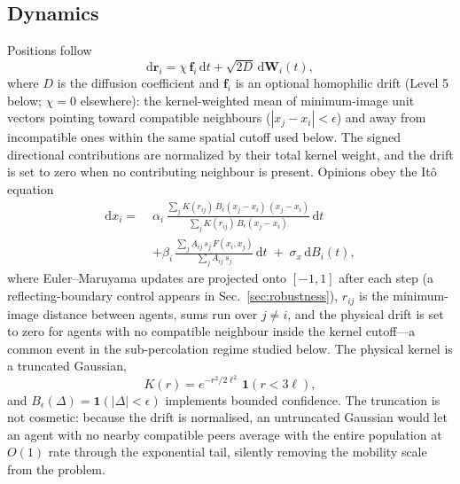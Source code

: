 \documentclass[5p,times,twocolumn]{elsarticle}
\newcommand{\rr}{\mathbf{r}}
\newcommand{\dd}{\mathrm{d}}
\begin{document}
\subsection{Dynamics}

Positions follow
\begin{equation}
  \dd\rr_i = \chi\, \mathbf{f}_i\,\dd t + \sqrt{2D}\,\dd\mathbf{W}_i(t),
  \label{eq:motion}
\end{equation}
where $D$ is the diffusion coefficient and $\mathbf{f}_i$ is an optional
homophilic drift (Level 5 below; $\chi = 0$ elsewhere): the
kernel-weighted mean of minimum-image unit vectors pointing toward
compatible neighbours ($|x_j-x_i|<\epsilon$) and away from incompatible
ones within the same spatial cutoff used below. The signed directional
contributions are normalized by their total kernel weight, and the drift
is set to zero when no contributing neighbour is present. Opinions obey
the It\^o equation
\begin{align}
  \dd x_i =\;&
  \alpha_i \,
  \frac{\sum_j K(r_{ij})\, B_\epsilon(x_j - x_i)\,(x_j - x_i)}
       {\sum_j K(r_{ij})\, B_\epsilon(x_j - x_i)} \,\dd t
  \nonumber\\
  &+
  \beta_i \,
  \frac{\sum_j A_{ij}\, s_j\, F(x_i, x_j)}
       {\sum_j A_{ij}\, s_j} \,\dd t
  \;+\;
  \sigma_x\, \dd B_i(t),
  \label{eq:opinion}
\end{align}
where Euler--Maruyama updates are projected onto $[-1,1]$ after each step
(a reflecting-boundary control appears in Sec.~\ref{sec:robustness}),
$r_{ij}$ is the
minimum-image distance between agents, sums run over $j \ne i$, and the
physical drift is set to zero for agents with no compatible neighbour
inside the kernel cutoff---a common event in the sub-percolation regime
studied below. The physical kernel is a truncated Gaussian,
\begin{equation}
  K(r) = e^{-r^2 / 2\ell^2}\, \mathbf{1}(r < 3\ell),
  \label{eq:kernel}
\end{equation}
and $B_\epsilon(\Delta) = \mathbf{1}(|\Delta| < \epsilon)$ implements
bounded confidence. The truncation is not cosmetic: because the drift is
normalised, an untruncated Gaussian would let an agent with no nearby
compatible peers average with the entire population at $O(1)$ rate through
the exponential tail, silently removing the mobility scale from the
problem.
\end{document}
